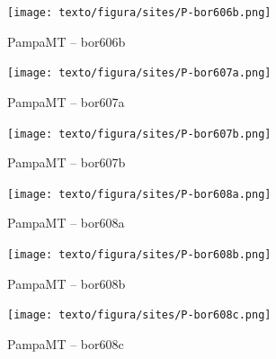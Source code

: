     \begin{figure}[H]
        \caption{PampaMT -- bor606b}
            \begin{center}
                \texttt{[image: texto/figura/sites/P-bor606b.png]}
            \end{center}
    \end{figure}
    
    \begin{figure}[H]
        \caption{PampaMT -- bor607a}
            \begin{center}
                \texttt{[image: texto/figura/sites/P-bor607a.png]}
            \end{center}
    \end{figure}
    
    \begin{figure}[H]
        \caption{PampaMT -- bor607b}
            \begin{center}
                \texttt{[image: texto/figura/sites/P-bor607b.png]}
            \end{center}
    \end{figure}
    
    \begin{figure}[H]
        \caption{PampaMT -- bor608a}
            \begin{center}
                \texttt{[image: texto/figura/sites/P-bor608a.png]}
            \end{center}
    \end{figure}
    
    \begin{figure}[H]
        \caption{PampaMT -- bor608b}
            \begin{center}
                \texttt{[image: texto/figura/sites/P-bor608b.png]}
            \end{center}
    \end{figure}
    
    \begin{figure}[H]
        \caption{PampaMT -- bor608c}
            \begin{center}
                \texttt{[image: texto/figura/sites/P-bor608c.png]}
            \end{center}
    \end{figure}
